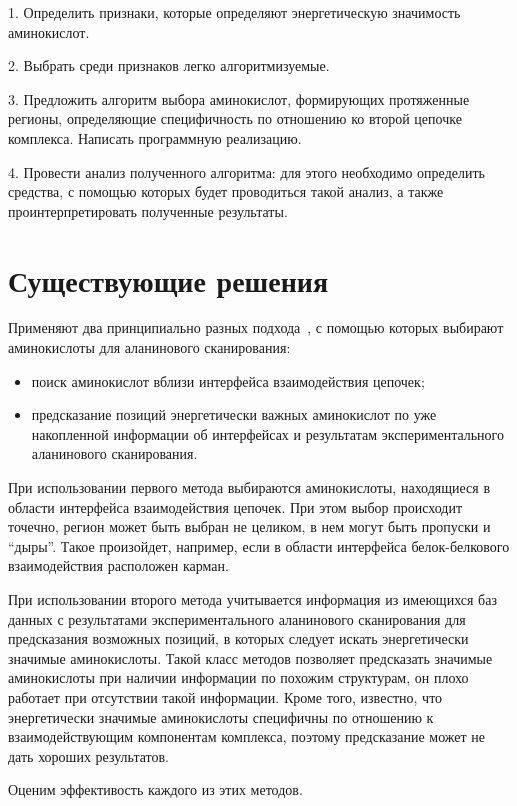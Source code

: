 1. Определить признаки, которые определяют энергетическую значимость аминокислот.

2. Выбрать среди признаков легко алгоритмизуемые.

3. Предложить алгоритм выбора аминокислот, формирующих протяженные регионы, определяющие специфичность по отношению ко второй цепочке комплекса. Написать программную реализацию.

4. Провести анализ полученного алгоритма: для этого необходимо определить средства, с помощью которых будет проводиться такой анализ, а также проинтерпретировать полученные результаты.
\section{Существующие решения}


Применяют два принципиально разных подхода~\cite{hotspots2012rev}, с помощью которых выбирают аминокислоты для аланинового сканирования: 
\begin{itemize}
\item поиск аминокислот вблизи интерфейса взаимодействия цепочек;
\item предсказание позиций энергетически важных аминокислот по уже накопленной информации об интерфейсах и результатам экспериментального аланинового сканирования.
\end{itemize}


При использовании первого метода выбираются аминокислоты, находящиеся в области интерфейса взаимодействия цепочек. При этом выбор происходит точечно, регион может быть выбран не целиком, в нем могут быть пропуски и “дыры”. Такое произойдет, например, если в области интерфейса белок-белкового взаимодействия расположен карман.

При использовании второго метода учитывается информация из имеющихся баз данных с результатами экспериментального аланинового сканирования для предсказания возможных позиций, в которых следует искать энергетически значимые аминокислоты. Такой класс методов позволяет предсказать значимые аминокислоты при наличии информации по похожим структурам, он плохо работает при отсутствии такой информации. Кроме того, известно, что энергетически значимые аминокислоты специфичны по отношению к взаимодействующим компонентам комплекса, поэтому предсказание может не дать хороших результатов.

Оценим эффективость каждого из этих методов.

